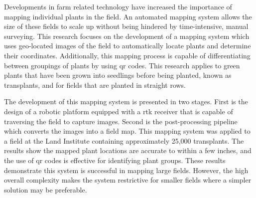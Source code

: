 
\pagestyle{empty}
\setlength{\baselineskip}{0.8cm}




Developments in farm related technology have increased the importance of mapping individual plants in the field.  An automated mapping system allows the size of these fields to scale up without being hindered by time-intensive, manual surveying.  This research focuses on the development of a mapping system which uses geo-located images of the field to automatically locate plants and determine their coordinates.  Additionally, this mapping process is capable of differentiating between groupings of plants by using \ac{qr} codes.  This research applies to green plants that have been grown into seedlings before being planted, known as transplants, and for fields that are planted in straight rows. 

The development of this mapping system is presented in two stages.  First is the design of a robotic platform equipped with a \ac{rtk} receiver that is capable of traversing the field to capture images. Second is the post-processing pipeline which converts the images into a field map.  This mapping system was applied to a field at the Land Institute containing approximately 25,000 transplants. The results show the mapped plant locations are accurate to within a few inches, and the use of \ac{qr} codes is effective for identifying plant groups.  These results demonstrate this system is successful in mapping large fields.  However, the high overall complexity makes the system restrictive for smaller fields where a simpler solution may be preferable. 
